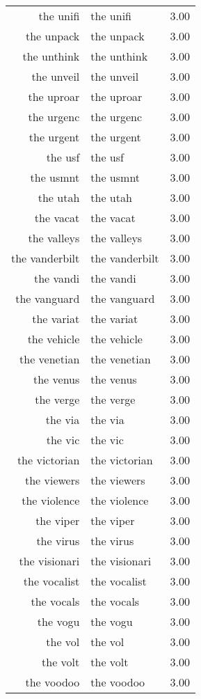 \begin{table}[ht]
\begin{tabular}{rlr}
  the unifi & the unifi & 3.00 \\ 
  the unpack & the unpack & 3.00 \\ 
  the unthink & the unthink & 3.00 \\ 
  the unveil & the unveil & 3.00 \\ 
  the uproar & the uproar & 3.00 \\ 
  the urgenc & the urgenc & 3.00 \\ 
  the urgent & the urgent & 3.00 \\ 
  the usf & the usf & 3.00 \\ 
  the usmnt & the usmnt & 3.00 \\ 
  the utah & the utah & 3.00 \\ 
  the vacat & the vacat & 3.00 \\ 
  the valleys & the valleys & 3.00 \\ 
  the vanderbilt & the vanderbilt & 3.00 \\ 
  the vandi & the vandi & 3.00 \\ 
  the vanguard & the vanguard & 3.00 \\ 
  the variat & the variat & 3.00 \\ 
  the vehicle & the vehicle & 3.00 \\ 
  the venetian & the venetian & 3.00 \\ 
  the venus & the venus & 3.00 \\ 
  the verge & the verge & 3.00 \\ 
  the via & the via & 3.00 \\ 
  the vic & the vic & 3.00 \\ 
  the victorian & the victorian & 3.00 \\ 
  the viewers & the viewers & 3.00 \\ 
  the violence & the violence & 3.00 \\ 
  the viper & the viper & 3.00 \\ 
  the virus & the virus & 3.00 \\ 
  the visionari & the visionari & 3.00 \\ 
  the vocalist & the vocalist & 3.00 \\ 
  the vocals & the vocals & 3.00 \\ 
  the vogu & the vogu & 3.00 \\ 
  the vol & the vol & 3.00 \\ 
  the volt & the volt & 3.00 \\ 
  the voodoo & the voodoo & 3.00 \\ 

\end{tabular}
\end{table}
